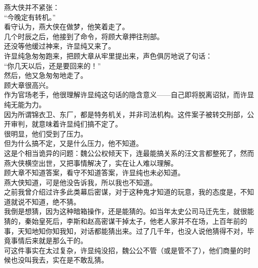 \begin{multicols}{\theparacolNo}
燕大侠并不紧张：\\

“今晚定有转机。”\\

看守认为，燕大侠在做梦，他笑着走了。\\

几个时辰之后，他接到了命令，将顾大章押往刑部。\\

还没等他缓过神来，许显纯又来了。\\

许显纯急匆匆跑来，把顾大章从牢里提出来，声色俱厉地说了句话：\\

“你几天以后，还是要回来的！”\\

然后，他又急匆匆地走了。\\

顾大章很高兴。\\

作为官场老手，他很理解许显纯这句话的隐含意义——自己即将脱离诏狱，而许显纯无能为力。\\

因为所谓锦衣卫、东厂，都是特务机关，并非司法机构。这件案子被转交刑部，公开审判，就意味着许显纯们搞不定了。\\

很明显，他们受到了压力。\\

但为什么搞不定，又是什么压力，他不知道。\\

这是个相当诡异的问题：魏公公权倾天下，连最能搞关系的汪文言都整死了，然而燕大侠横空出世，又把事情解决了，实在让人难以理解。\\

顾大章不知道答案，看守不知道答案，许显纯也未必知道。\\

燕大侠知道，可是他没告诉我，所以我也不知道。\\

之前我曾介绍过许多此类幕后密谋，对于这种鬼才知道的玩意，我的态度是，不知道就说不知道，绝不猜。\\

我倒是想猜，因为这种暗箱操作，还是能猜的。如当年太史公司马迁先生，就很能猜的，秦始皇死后，李斯和赵高密谋干掉太子，他老人家并不在场，上百年前的事，天知地知你知我知，对话都能猜出来。过了几千年，也没人说他猜得不对，毕竟事情后来就是那么干的。\\

可这件事实在太过复杂，许显纯没招，魏公公不管（或是管不了），他们商量的时候也没叫我去，实在是不敢乱猜。\\


\end{multicols}
